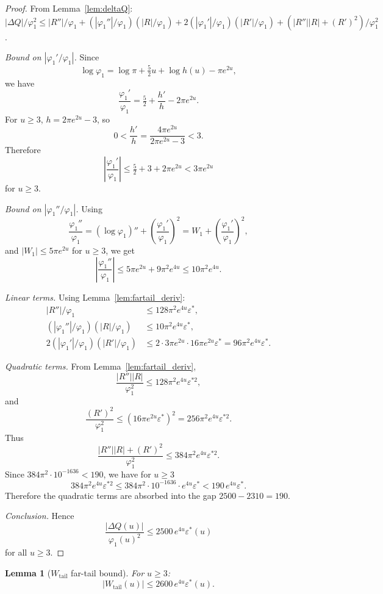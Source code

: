 \documentclass[11pt]{article}
\newtheorem{lemma}[theorem]{Lemma}
\theoremstyle{definition}
\theoremstyle{remark}
\begin{document}
\begin{proof}
From Lemma~\ref{lem:deltaQ}:
$|\Delta Q|/\varphi_1^2
\leq |R''|/\varphi_1 + (|\varphi_1''|/\varphi_1)(|R|/\varphi_1)
    + 2(|\varphi_1'|/\varphi_1)(|R'|/\varphi_1)
    + (|R''||R| + (R')^2)/\varphi_1^2$.

\emph{Bound on $|\varphi_1'/\varphi_1|$.}
Since
\[
\log\varphi_1=\log\pi+\tfrac{5}{2}u+\log h(u)-\pi e^{2u},
\]
we have
\[
\frac{\varphi_1'}{\varphi_1}
=
\tfrac{5}{2}+\frac{h'}{h}-2\pi e^{2u}.
\]
For $u\ge3$, $h=2\pi e^{2u}-3$, so
\[
0<\frac{h'}{h}
=
\frac{4\pi e^{2u}}{2\pi e^{2u}-3}
<3.
\]
Therefore
\[
\left|\frac{\varphi_1'}{\varphi_1}\right|
\le
\tfrac{5}{2}+3+2\pi e^{2u}
<
3\pi e^{2u}
\]
for $u\ge3$.

\emph{Bound on $|\varphi_1''/\varphi_1|$.}
Using
\[
\frac{\varphi_1''}{\varphi_1}
=
(\log\varphi_1)''
+
\left(\frac{\varphi_1'}{\varphi_1}\right)^{\!2}
=
W_1+
\left(\frac{\varphi_1'}{\varphi_1}\right)^{\!2},
\]
and $|W_1|\le 5\pi e^{2u}$ for $u\ge3$, we get
\[
\left|\frac{\varphi_1''}{\varphi_1}\right|
\le
5\pi e^{2u}+9\pi^2e^{4u}
\le
10\pi^2e^{4u}.
\]

\emph{Linear terms.}
Using Lemma~\ref{lem:fartail_deriv}:
\begin{align*}
|R''|/\varphi_1 &\leq 128\pi^2 e^{4u}\varepsilon^*,\\
(|\varphi_1''|/\varphi_1)(|R|/\varphi_1) &\leq 10\pi^2 e^{4u}\varepsilon^*,\\
2(|\varphi_1'|/\varphi_1)(|R'|/\varphi_1) &\leq 2\cdot3\pi e^{2u}\cdot 16\pi e^{2u}\varepsilon^* = 96\pi^2 e^{4u}\varepsilon^*.
\end{align*}

\emph{Quadratic terms.}
From Lemma~\ref{lem:fartail_deriv},
\[
\frac{|R''||R|}{\varphi_1^2}
\le
128\pi^2 e^{4u}\varepsilon^{*2},
\]
and
\[
\frac{(R')^2}{\varphi_1^2}
\le
(16\pi e^{2u}\varepsilon^*)^2
=
256\pi^2 e^{4u}\varepsilon^{*2}.
\]
Thus
\[
\frac{|R''||R|+(R')^2}{\varphi_1^2}
\le
384\pi^2 e^{4u}\varepsilon^{*2}.
\]
Since $384\pi^2\cdot 10^{-1636}<190$, we have for $u\ge3$
\[
384\pi^2 e^{4u}\varepsilon^{*2}
\le
384\pi^2\cdot 10^{-1636}\cdot e^{4u}\varepsilon^*
<
190\,e^{4u}\varepsilon^*.
\]
Therefore the quadratic terms are absorbed into the gap $2500-2310=190$.

\emph{Conclusion.}
Hence
\[
\frac{|\Delta Q(u)|}{\varphi_1(u)^2}
\le
2500\,e^{4u}\varepsilon^*(u)
\]
for all $u\ge3$.
\end{proof}

\begin{lemma}[$W_{\mathrm{tail}}$ far-tail bound]\label{lem:fartail_Wtail}
For $u\geq 3$:
\[
|W_{\mathrm{tail}}(u)| \leq 2600\,e^{4u}\varepsilon^*(u).
\]
\end{lemma}
\end{document}
